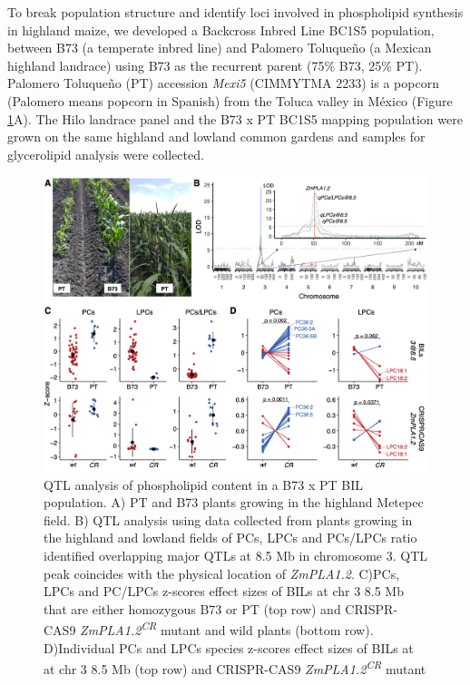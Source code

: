 \documentclass[9pt,twocolumn,twoside,lineno]{BioRxiv}
\begin{document}
To break population structure and identify loci involved in phospholipid synthesis in highland maize, we developed a Backcross Inbred  Line BC1S5 population, between B73 (a temperate inbred line) and Palomero Toluqueño (a Mexican highland landrace) using B73 as the recurrent parent (75\% B73, 25\% PT). 
Palomero Toluqueño (PT) accession \textit{Mexi5} (CIMMYTMA 2233) is a popcorn (Palomero means popcorn in Spanish) from the Toluca valley in México (Figure \ref{Fig3}A). 
The Hilo landrace panel and the B73 x PT BC1S5 mapping population were grown on the same highland and lowland common gardens and samples for glycerolipid analysis were collected.  
\begin{figure}[!ht]
\begin{center}
\includegraphics[width=0.8\paperwidth]{Figures/Fig_3.png}
\caption{QTL analysis of phospholipid content in a B73 x PT BIL population. 
A) PT and B73 plants growing in the highland Metepec field. 
B) QTL analysis using data collected from plants growing in the highland and lowland fields of PCs, LPCs and PCs/LPCs ratio identified overlapping major QTLs at 8.5 Mb in chromosome 3. 
QTL peak coincides with the physical location of \textit{ZmPLA1.2}. 
C)PCs, LPCs and PC/LPCs z-scores effect sizes of BILs at chr 3 8.5 Mb that are either homozygous B73 or PT (top row) and CRISPR-CAS9 \textit{ZmPLA1.2\textsuperscript{CR}} mutant and wild plants (bottom row).        
D)Individual PCs and LPCs species z-scores effect sizes of BILs at at chr 3 8.5 Mb (top row) and CRISPR-CAS9 \textit{ZmPLA1.2\textsuperscript{CR}} mutant}
\label{Fig3}
\end{center}
\end{figure} 
\end{document}
